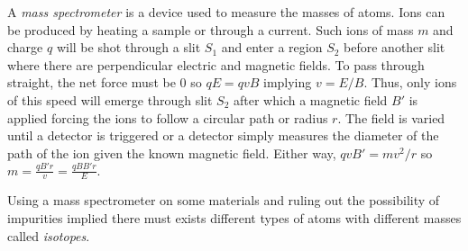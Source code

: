 \begin{definition}
    A \emph{mass spectrometer} is a device used to measure the masses of atoms. Ions can be produced by heating a sample or through a current. Such ions of mass $m$ and charge $q$ will be shot through a slit $S_1$ and enter a region $S_2$ before another slit where there are perpendicular electric and magnetic fields. To pass through straight, the net force must be 0 so $qE = qvB$ implying $v = E/B$. Thus, only ions of this speed will emerge through slit $S_2$ after which a magnetic field $B'$ is applied forcing the ions to follow a circular path or radius $r$. The field is varied until a detector is triggered or a detector simply measures the diameter of the path of the ion given the known magnetic field. Either way, $qvB' = mv^2/r$ so $m = \frac{qB'r}{v} = \frac{qBB'r}{E}.$
\end{definition}
\begin{remark}[Isotopes]
    Using a mass spectrometer on some materials and ruling out the possibility of impurities implied there must exists different types of atoms with different masses called \emph{isotopes}.
\end{remark}